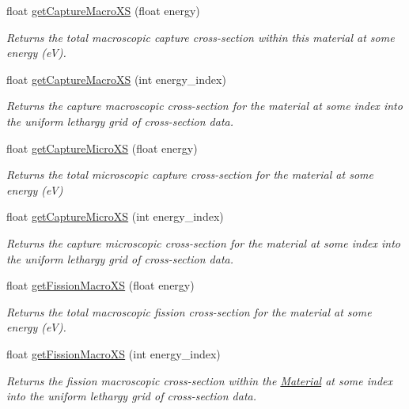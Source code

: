 \begin{DoxyCompactItemize}
float \hyperlink{classMaterial_aa7c68ddfd303f5b93e391a9f7c8bc525}{get\-Capture\-Macro\-X\-S} (float energy)
\begin{DoxyCompactList}\small\item\em Returns the total macroscopic capture cross-\/section within this material at some energy (e\-V). \end{DoxyCompactList}\item 
float \hyperlink{classMaterial_a3c78a51474dfde84489f8b60f7c46fc0}{get\-Capture\-Macro\-X\-S} (int energy\-\_\-index)
\begin{DoxyCompactList}\small\item\em Returns the capture macroscopic cross-\/section for the material at some index into the uniform lethargy grid of cross-\/section data. \end{DoxyCompactList}\item 
float \hyperlink{classMaterial_a977da465b8165936e8e1847289334d0c}{get\-Capture\-Micro\-X\-S} (float energy)
\begin{DoxyCompactList}\small\item\em Returns the total microscopic capture cross-\/section for the material at some energy (e\-V) \end{DoxyCompactList}\item 
float \hyperlink{classMaterial_ad6b27638e6fb249552475702e33b789e}{get\-Capture\-Micro\-X\-S} (int energy\-\_\-index)
\begin{DoxyCompactList}\small\item\em Returns the capture microscopic cross-\/section for the material at some index into the uniform lethargy grid of cross-\/section data. \end{DoxyCompactList}\item 
float \hyperlink{classMaterial_aeb48f420c8334d454e805fa62c8d0f51}{get\-Fission\-Macro\-X\-S} (float energy)
\begin{DoxyCompactList}\small\item\em Returns the total macroscopic fission cross-\/section for the material at some energy (e\-V). \end{DoxyCompactList}\item 
float \hyperlink{classMaterial_a1aef50eaf3e67ecd125269110c69882f}{get\-Fission\-Macro\-X\-S} (int energy\-\_\-index)
\begin{DoxyCompactList}\small\item\em Returns the fission macroscopic cross-\/section within the \hyperlink{classMaterial}{Material} at some index into the uniform lethargy grid of cross-\/section data. \end{DoxyCompactList}\item 

\end{DoxyCompactItemize}
